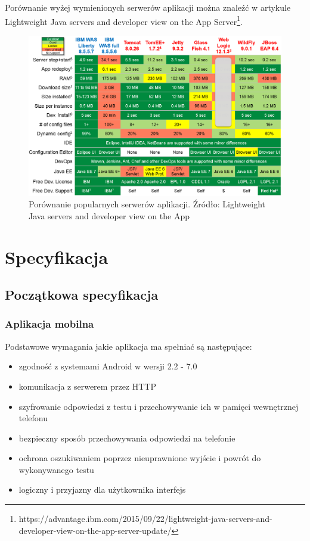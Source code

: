 \documentclass{report}
\begin{document}
			Porównanie wyżej wymienionych serwerów aplikacji można znaleźć w artykule Lightweight Java servers and developer view on the App Server\footnote{https://advantage.ibm.com/2015/09/22/lightweight-java-servers-and-developer-view-on-the-app-server-update/}.
		
			\begin{center}
				\begin{figure}[ht]
					\centering
					\includegraphics[scale=0.55]{weblogic-jboss-wildfly-websphere-liberty-tomee-tomcat-glassfish-comparison1.png}
					\caption{Porównanie popularnych serwerów aplikacji. Źródło: Lightweight Java servers and developer view on the App}
				\end{figure}
			\end{center}
	
	\chapter{Specyfikacja}
	
		\section{Początkowa specyfikacja}
		
			\subsection{Aplikacja mobilna}
			Podstawowe wymagania jakie aplikacja ma spełniać są następujące:
			\begin{itemize}
				\item zgodność z systemami Android w wersji 2.2 - 7.0
				\item komunikacja z serwerem przez HTTP
				\item szyfrowanie odpowiedzi z testu i przechowywanie ich w pamięci wewnętrznej telefonu
				\item bezpieczny sposób przechowywania odpowiedzi na telefonie
				\item ochrona oszukiwaniem poprzez nieuprawnione wyjście i powrót do wykonywanego testu
				\item logiczny i przyjazny dla użytkownika interfejs
			\end{itemize}
		
\end{document}
